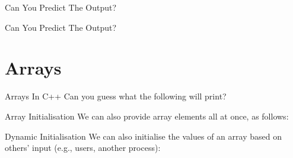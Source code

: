 \documentclass[aspectratio=169, 12pt]{beamer}
\begin{document}

	\begin{frame}{Can You Predict The Output?}
		\scalebox{0.85}{%
		}
	\end{frame}

	\begin{frame}{Can You Predict The Output?}
		
	\end{frame}

	\section{Arrays}\label{sec:arrays}
	
	\sectionframe
	
	\begin{frame}{Arrays In C++}
		Can you guess what the following will print?
		\scalebox{0.95}{%
		}
	\end{frame}
	
	\begin{frame}{Array Initialisation}
		We can also provide array elements all at once, as follows:
		
	\end{frame}
	
	\begin{frame}{Dynamic Initialisation}
		We can also initialise the values of an array based on others' input (e.g., users, another process):
		\scalebox{0.95}{%
		}
	\end{frame}
	
\end{document}
